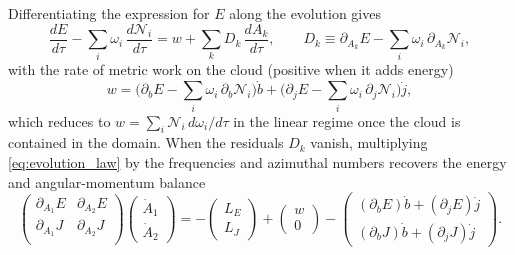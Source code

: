 
Differentiating the expression for $E$ along the evolution gives
\begin{equation}
    \label{eq:energy_action_residual}
    \frac{dE}{d\tau}-\sum_i\omega_i\,\frac{d\mathcal{N}_i}{d\tau} = w+\sum_k D_k\,\frac{dA_k}{d\tau},
    \qquad
    D_k \equiv \partial_{A_k}E-\sum_i\omega_i\,\partial_{A_k}\mathcal{N}_i ,
\end{equation}
with the rate of metric work on the cloud (positive when it adds energy)
\begin{equation}
    \label{eq:metric_work}
    w = \Big(\partial_b E-\sum_i\omega_i\,\partial_b\mathcal{N}_i\Big)\dot{b} + \Big(\partial_j E-\sum_i\omega_i\,\partial_j\mathcal{N}_i\Big)\dot{j},
\end{equation}
which reduces to $w=\sum_i\mathcal{N}_i\,d\omega_i/d\tau$ in the linear regime once the cloud is contained in the domain. When the residuals $D_k$ vanish, multiplying \eqref{eq:evolution_law} by the frequencies and azimuthal numbers recovers the energy and angular-momentum balance
\begin{equation}
    \label{eq:evolving_background_balance}
    \begin{pmatrix}
    \partial_{A_1} E & \partial_{A_2} E \\
    \partial_{A_1} J & \partial_{A_2} J \\
    \end{pmatrix}\begin{pmatrix}\dot{A}_1 \\ \dot{A}_2\end{pmatrix} = -\begin{pmatrix}L_E \\ L_J\end{pmatrix} + \begin{pmatrix}w \\ 0\end{pmatrix} - \begin{pmatrix}(\partial_b E)\dot{b} + (\partial_j E)\dot{j} \\ (\partial_b J)\dot{b} + (\partial_j J)\dot{j}\end{pmatrix}.
\end{equation}

